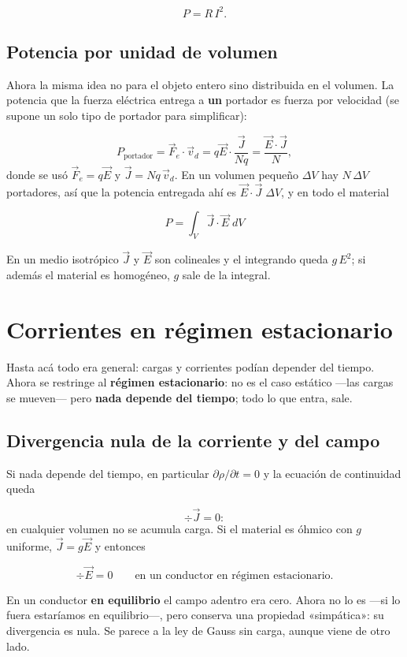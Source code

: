 \documentclass[12pt,a4paper]{article}
\begin{document}
\[
P = R\,I^2 .
\]

\subsection{Potencia por unidad de volumen}

Ahora la misma idea no para el objeto entero sino distribuida en el volumen. La
potencia que la fuerza eléctrica entrega a \textbf{un} portador es fuerza por
velocidad (se supone un solo tipo de portador para simplificar):

\[
P_{\text{portador}} = \vec F_e\cdot\vec v_d
= q\vec E\cdot\frac{\vec J}{Nq} = \frac{\vec E\cdot\vec J}{N},
\]
donde se usó $\vec F_e = q\vec E$ y $\vec J = Nq\,\vec v_d$. En un volumen
pequeño $\Delta V$ hay $N\,\Delta V$ portadores, así que la potencia entregada
ahí es $\vec E\cdot\vec J\;\Delta V$, y en todo el material

\begin{keybox}
\[
\boxed{\ P = \int_V \vec J\cdot\vec E\;dV\ }
\]
\end{keybox}

En un medio isotrópico $\vec J$ y $\vec E$ son colineales y el integrando queda
$g\,E^2$; si además el material es homogéneo, $g$ sale de la integral.

\section{Corrientes en régimen estacionario}

Hasta acá todo era general: cargas y corrientes podían depender del tiempo. Ahora
se restringe al \textbf{régimen estacionario}: no es el caso estático ---las cargas se
mueven--- pero \textbf{nada depende del tiempo}; todo lo que entra, sale.

\subsection{Divergencia nula de la corriente y del campo}

Si nada depende del tiempo, en particular $\partial\rho/\partial t = 0$ y la
ecuación de continuidad queda

\[
\div \vec J = 0 :
\]
en cualquier volumen no se acumula carga. Si el material es óhmico con $g$
uniforme, $\vec J = g\vec E$ y entonces

\[
\div \vec E = 0 \qquad \text{en un conductor en régimen estacionario.}
\]

En un conductor \textbf{en equilibrio} el campo adentro era cero. Ahora no lo es ---si
lo fuera estaríamos en equilibrio---, pero conserva una propiedad «simpática»: su
divergencia es nula. Se parece a la ley de Gauss sin carga, aunque viene de
otro lado.
\end{document}
